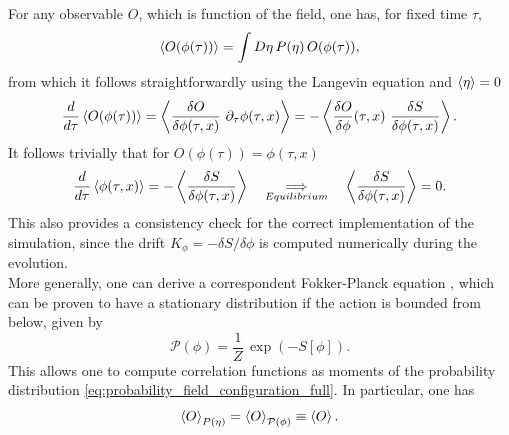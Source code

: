 For any observable $O$, which is function of the field, one has, for fixed time $\tau$,
\begin{equation*}
    \left\langle O(\phi(\tau)) \right\rangle = \int D\eta \, P(\eta) \, O(\phi(\tau)),
\end{equation*}
from which it follows straightforwardly using the Langevin equation and $\left\langle \eta \right\rangle = 0$
\begin{equation*}
    \frac{d}{d\tau} \left\langle O(\phi(\tau)) \right\rangle = \left\langle \frac{\delta O}{\delta \phi(\tau, x)} \ \partial_\tau \phi(\tau, x) \right\rangle = -\left\langle \frac{\delta O}{\delta \phi}(\tau, x) \ \frac{\delta S}{\delta \phi(\tau, x)} \right\rangle.
\end{equation*}
It follows trivially that for $O(\phi(\tau)) = \phi(\tau, x)$
\begin{equation*}
        \frac{d}{d\tau} \left\langle \phi(\tau, x) \right\rangle = -\left\langle \frac{\delta S}{\delta \phi(\tau, x)} \right\rangle \quad \underset{Equilibrium}{\Longrightarrow} \quad \left\langle \frac{\delta S}{\delta \phi(\tau, x)} \right\rangle = 0.
\end{equation*}
This also provides a consistency check for the correct implementation of the simulation, since the drift $K_\phi = -\delta S / \delta \phi$ is computed numerically during the evolution. \\
More generally, one can derive a correspondent Fokker-Planck equation \cite{gardiner}, which can be proven to have a stationary distribution if the action is bounded from below, given by \cite{Damgaard1987StochasticQuantization}
\begin{equation}
    \mathcal{P}(\phi) = \frac{1}{Z} \, \exp\left(-S[\phi]\right).
    \label{eq:probability_field_configuration_full}
\end{equation}
This allows one to compute correlation functions as moments of the  probability distribution \eqref{eq:probability_field_configuration_full}. In particular, one has 
\begin{equation}
    \left\langle O \right\rangle_{P(\eta)} = \left\langle O \right\rangle_{\mathcal{P}(\phi)} \equiv \left\langle O \right\rangle.
    \label{eq:expectation_observables}
\end{equation}

